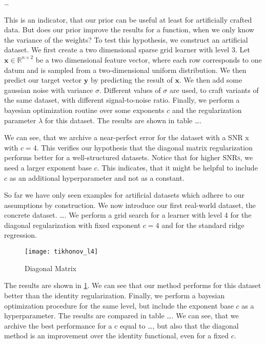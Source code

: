 \ldots

This is an indicator, that our prior can be useful at least for artificially
crafted data.
But does our prior improve the results for a function, when we only know the
variance of the weights?
To test this hypothesis, we construct an artificial dataset.
We first create a two dimensional sparse grid learner with level 3.
Let \(\bm{x} \in \mathbb{R}^{n \times 2}\) be a two dimensional feature vector,
where each row corresponds to one datum and is sampled from a two-dimensional
uniform distribution.
We then predict our target vector \(\bm{y}\) by predicting the result of
\(\bm{x}\).
We then add some gaussian noise with variance \(\sigma\).
Different values of \(\sigma\) are used, to craft variants of the same dataset,
with different signal-to-noise ratio.
Finally, we perform a bayesian optimization routine over some exponents \(c\)
and the regularization parameter \(\lambda\) for this dataset.
The results are shown in table \ldots.

We can see, that we archive a near-perfect error for the dataset with a
\textsc{SNR} x with \(c = 4\).
This verifies our hypothesis that the diagonal matrix regularization performs
better for a well-structured datasets.
Notice that for higher \textsc{SNRs}, we need a larger exponent base \(c\).
This indicates, that it might be helpful to include \(c\) as an additional
hyperparameter and not as a constant.

So far we have only seen examples for artificial datasets which adhere to our
assumptions by construction.
We now introduce our first real-world dataset, the concrete dataset.
\ldots.
We perform a grid search for a learner with level 4 for the diagonal
regularization with fixed exponent \(c = 4\) and for the standard ridge
regression.

\begin{figure}[htb]
  \centering
  \texttt{[image: tikhonov\_l4]}
  \caption{Diagonal Matrix}
  \label{fig:tikhonov-l4}
\end{figure}

The results are shown in \cref{fig:tikhonov-l4}.
We can see that our method performs for this dataset better than the identity regularization.
Finally, we perform a bayesian optimization procedure for the same level, but include the exponent base \(c\) as a hyperparameter.
The results are compared in table \ldots.
We can see, that we archive the best performance for a c equal to \ldots, but
also that the diagonal method is an improvement over the identity functional,
even for a fixed \(c\).


